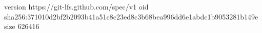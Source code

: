 version https://git-lfs.github.com/spec/v1
oid sha256:371010d2bf2b2093b41a51c8c23ed8c3b68bea996dd6e1abdc1b9053281b149e
size 626416
